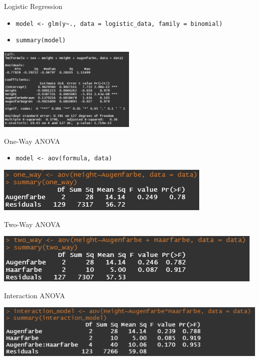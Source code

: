 \documentclass[aspectratio = 169]{chariteBeamer}
\begin{document}
\begin{frame}[fragile]{Logistic Regression}
	\begin{itemize}
		\item \verb+model <- glm(y~., data = logistic_data, family = binomial)+
		\item \verb+summary(model)+
	\end{itemize}
			
	\begin{center}
		\includegraphics[height=4cm]{LogisticRegressionSummary}
	\end{center}
\end{frame}

\begin{frame}[fragile]{One-Way ANOVA}
	\begin{itemize}
		\item \verb+model <- aov(formula, data)+
	\end{itemize}	
	\begin{center}
		\includegraphics{OneWay}
	\end{center}
\end{frame}

\begin{frame}[fragile]{Two-Way ANOVA}
	\begin{center}
		\includegraphics{TwoWay}
	\end{center}
\end{frame}

\begin{frame}[fragile]{Interaction ANOVA}
	\begin{center}
		\includegraphics{Interaction}
	\end{center}
\end{frame}
\end{document}
